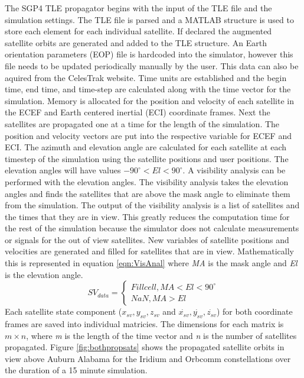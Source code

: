 \documentclass[12pt]{report}
\begin{document}
The SGP4 TLE propagator begins with the input of the TLE file and the simulation settings. The TLE file is parsed and a MATLAB structure is used to store each element for each individual satellite. If declared the augmented satellite orbits are generated and added to the TLE structure. An Earth orientation parameters (EOP) file is hardcoded into the simulator, however this file needs to be updated periodically manually by the user. This data can also be aquired from the CelesTrak website. Time units are established and the begin time, end time, and time-step are calculated along with the time vector for the simulation. Memory is allocated for the position and velocity of each satellite in the ECEF and Earth centered inertial (ECI) coordinate frames. Next the satellites are propagated one at a time for the length of the simulation. The position and velocity vectors are put into the respective variable for ECEF and ECI. The azimuth and elevation angle are calculated for each satellite at each timestep of the simulation using the satellite positions and user positions. The elevation angles will have values $-90^{\circ} < El < 90^{\circ}$. A visibility analysis can be performed with the elevation angles. The visibility analysis takes the elevation angles and finds the satellites that are above the mask angle to eliminate them from the simulation. The output of the visibility analysis is a list of satellites and the times that they are in view. This greatly reduces the computation time for the rest of the simulation because the simulator does not calculate measurements or signals for the out of view satellites. New variables of satellite positions and velocities are generated and filled for satellites that are in view. Mathematically this is represented in equation \ref{eqn:VisAnal} where \textit{MA} is the mask angle and \textit{El} is the elevation angle.
\begin{equation}
    SV_{data} = 
    \left\{
        \begin{array}{lr}
            Fill cell, MA < El < 90^\circ \\
            NaN, MA > El
        \end{array}
    \right.
    \label{eqn:VisAnal}
\end{equation}
Each satellite state component ($x_{sv},y_{sv},z_{sv}$ and $\dot{x_{sv}},\dot{y_{sv}},\dot{z_{sv}}$) for both coordinate frames are saved into individual matricies. The dimensions for each matrix is $m \times n$, where \textit{m} is the length of the time vector and \textit{n} is the number of satellites propagated.
Figure \ref{fig:bothpropsats} shows the propagated satellite orbits in view above Auburn Alabama for the Iridium and Orbcomm constellations over the duration of a 15 minute simulation. 
\end{document}
